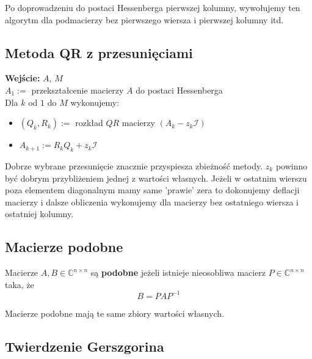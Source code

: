 \documentclass[../mn-notatki.tex]{subfiles}
\begin{document}
Po doprowadzeniu do postaci Hessenberga pierwszej kolumny, wywołujemy ten
algorytm dla podmacierzy bez pierwszego wiersza i pierwszej kolumny itd.

\subsection{Metoda QR z przesunięciami}

\begin{tcolorbox}
\textbf{Wejście:} $A$, $M$ \\
$A_1 := $ przekształcenie macierzy $A$ do postaci Hessenberga\\
Dla $k$ od $1$ do $M$ wykonujemy:
\begin{itemize}
    \item $(Q_k, R_k) := $ rozkład $QR$ macierzy $(A_k - z_k\mathcal{I})$
    \item $A_{k + 1} := R_kQ_k + z_k\mathcal{I}$
\end{itemize}
\end{tcolorbox}

Dobrze wybrane przesunięcie znacznie przyspiesza zbieżność metody.
$z_k$ powinno być dobrym przybliżeniem jednej z wartości własnych.
Jeżeli w ostatnim wierszu poza elementem diagonalnym mamy same 'prawie' zera
to dokonujemy deflacji macierzy i dalsze obliczenia wykonujemy dla macierzy
bez ostatniego wiersza i ostatniej kolumny.

\subsection{Macierze podobne}

\begin{tcolorbox}
Macierze $A, B \in \mathbb{C}^{n \times n}$ są \textbf{podobne} jeżeli
istnieje nieosobliwa macierz $P \in \mathbb{C}^{n \times n}$ taka, że
\[
B = P A P^{-1}
\]
\end{tcolorbox}

\begin{tcolorbox}
Macierze podobne mają te same zbiory wartości własnych.
\end{tcolorbox}


\subsection{Twierdzenie Gerszgorina}
\end{document}
